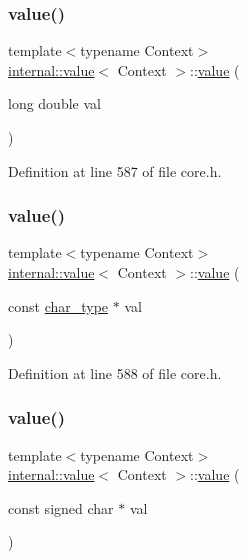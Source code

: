 \subsubsection{\texorpdfstring{value()}{value()}\hspace{0.1cm}{\footnotesize\ttfamily [6/12]}}
{\footnotesize\ttfamily template$<$typename Context$>$ \\
\hyperlink{classinternal_1_1value}{internal\+::value}$<$ Context $>$\+::\hyperlink{classinternal_1_1value}{value} (\begin{DoxyParamCaption}\item[{long double}]{val }\end{DoxyParamCaption})\hspace{0.3cm}{\ttfamily [inline]}}



Definition at line 587 of file core.\+h.

\mbox{\label{classinternal_1_1value_a6c49de972ba65b5f001650621e0f1f0e}} 
\subsubsection{\texorpdfstring{value()}{value()}\hspace{0.1cm}{\footnotesize\ttfamily [7/12]}}
{\footnotesize\ttfamily template$<$typename Context$>$ \\
\hyperlink{classinternal_1_1value}{internal\+::value}$<$ Context $>$\+::\hyperlink{classinternal_1_1value}{value} (\begin{DoxyParamCaption}\item[{const \hyperlink{classinternal_1_1value_aea7e71c59ab9961b645ed79e69aff80e}{char\+\_\+type} $\ast$}]{val }\end{DoxyParamCaption})\hspace{0.3cm}{\ttfamily [inline]}}



Definition at line 588 of file core.\+h.

\mbox{\label{classinternal_1_1value_ab2d0b55a212e07e485aca05295b0dc21}} 
\subsubsection{\texorpdfstring{value()}{value()}\hspace{0.1cm}{\footnotesize\ttfamily [8/12]}}
{\footnotesize\ttfamily template$<$typename Context$>$ \\
\hyperlink{classinternal_1_1value}{internal\+::value}$<$ Context $>$\+::\hyperlink{classinternal_1_1value}{value} (\begin{DoxyParamCaption}\item[{const signed char $\ast$}]{val }\end{DoxyParamCaption})\hspace{0.3cm}{\ttfamily [inline]}}



